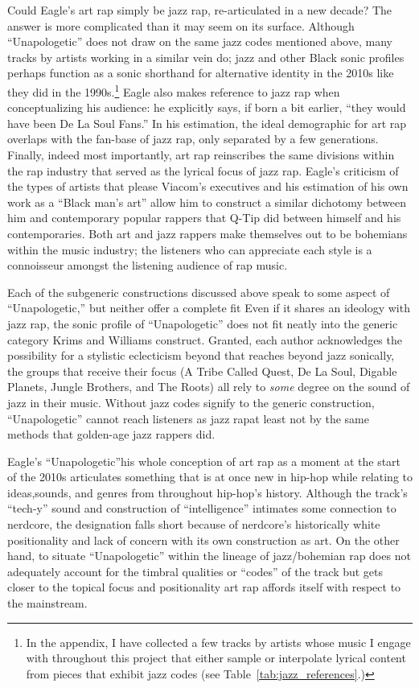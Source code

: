 Could Eagle's art rap simply be jazz rap, re-articulated in a new decade? The answer is more complicated than it may seem
on its surface. Although ``Unapologetic'' does not draw on the same jazz codes mentioned above, many tracks by artists working
in a similar vein do; jazz and other Black sonic profiles perhaps function as a sonic shorthand for alternative identity in the
2010s like they did in the 1990s.\footnote{
    In the appendix, I have collected a few tracks by artists whose music I engage with throughout this project that either 
    sample or interpolate lyrical content from pieces that exhibit jazz codes (see Table~\ref{tab:jazz_references}.)}
Eagle also makes reference to jazz rap when conceptualizing his audience: he explicitly says, if born a bit earlier, ``they 
would have been De La Soul Fans.'' In his estimation, the ideal demographic for art rap overlaps with the fan-base of jazz
rap, only separated by a few generations. Finally, indeed most importantly, art rap reinscribes the same divisions within
the rap industry that served as the lyrical focus of jazz rap. Eagle's criticism of the types of artists that please Viacom's
executives and his  estimation of his own work as a ``Black man's art'' allow him to construct a similar dichotomy between him
and contemporary popular rappers that Q-Tip did between himself and his contemporaries. Both art and jazz rappers make 
themselves out to be bohemians within the music industry; the listeners who can appreciate each style is a connoisseur
amongst the listening audience of rap music.

Each of the subgeneric constructions discussed above speak to some aspect of ``Unapologetic,'' but neither offer a complete
fit Even if it shares an ideology with jazz rap, the sonic profile of ``Unapologetic'' does not fit neatly into the generic 
category Krims and Williams construct. Granted, each author acknowledges the possibility for a stylistic eclecticism beyond
that reaches beyond jazz sonically, the groups that receive their focus (A Tribe Called Quest, De La Soul, Digable Planets, 
Jungle Brothers, and The Roots) all rely to \emph{some} degree on the sound of jazz in their music. Without jazz codes signify
to the generic construction,  ``Unapologetic'' cannot reach listeners as jazz rap\textemdash at least not by the same methods 
that golden-age jazz rappers did.

Eagle's ``Unapologetic''\textemdash his whole conception of art rap as a moment at the start of the 2010s\textemdash 
articulates something that is at once new in hip-hop while relating to ideas,sounds, and genres from throughout hip-hop's
history. Although the track's ``tech-y'' sound and construction of ``intelligence'' intimates some connection to nerdcore,
the designation falls short because of nerdcore's historically white positionality and lack of concern with its own 
construction  as art. On the other hand, to situate ``Unapologetic'' within the lineage of jazz/bohemian rap does not 
adequately account for the  timbral qualities or ``codes'' of the track but gets closer to the topical focus and positionality
art rap affords itself with respect to the mainstream.

